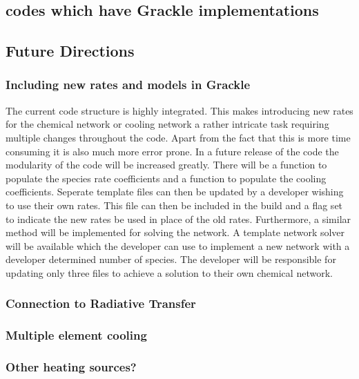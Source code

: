 \subsection{codes which have Grackle implementations}


\subsection{Future Directions} \label{Future_Directions}

\subsubsection{Including new rates and models in Grackle}
The current code structure is highly integrated. This makes introducing new rates for the 
chemical network or cooling network a rather intricate task requiring multiple changes throughout the code. 
Apart from the fact that this is more time consuming it is also much more error prone. In a future release of the 
code the modularity of the code will be increased greatly. There will be a function to populate the species 
rate coefficients and a function to populate the cooling coefficients. Seperate template files can then be 
updated by a developer wishing to use their own rates. This file can then be included in the build and a flag
set to indicate the new rates be used in place of the old rates. Furthermore, a similar method will be 
implemented for solving the network. A template network solver will be available which the developer can use to 
implement a new network with a developer determined number of species. The developer will be responsible for
updating only three files to achieve a solution to their own chemical network. 

\subsubsection{Connection to Radiative Transfer}

\subsubsection{Multiple element cooling}

\subsubsection{Other heating sources?}
